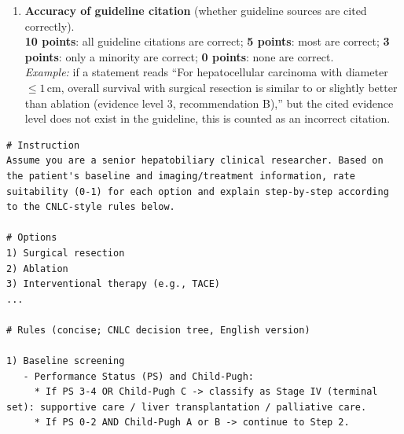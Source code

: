 \documentclass{article}
\begin{document}
\begin{appendices}
\begin{enumerate}
  \item \textbf{Accuracy of guideline citation} (whether guideline sources are cited correctly).\\
  \textbf{10 points}: all guideline citations are correct; \textbf{5 points}: most are correct; \textbf{3 points}: only a minority are correct; \textbf{0 points}: none are correct.\\
  \emph{Example:} if a statement reads “For hepatocellular carcinoma with diameter $\leq 1$\,cm, overall survival with surgical resection is similar to or slightly better than ablation (evidence level 3, recommendation B),” but the cited evidence level does not exist in the guideline, this is counted as an incorrect citation.
\end{enumerate}

\clearpage

\renewcommand{\figurename}{Figure}
\renewcommand{\tablename}{Table}
\renewcommand{\thefigure}{A\arabic{figure}} %
\renewcommand{\thetable}{A\arabic{table}}
\setcounter{table}{1}

\setcounter{figure}{0}
\newpage
\label{secA1}
\begin{lstlisting}[style=promptmono,floatplacement=h,caption={The summary of decision tree of CNLC},label={lst:hcc_prompt_cnlc}]
# Instruction
Assume you are a senior hepatobiliary clinical researcher. Based on the patient's baseline and imaging/treatment information, rate suitability (0-1) for each option and explain step-by-step according to the CNLC-style rules below.

# Options
1) Surgical resection
2) Ablation
3) Interventional therapy (e.g., TACE)
...

# Rules (concise; CNLC decision tree, English version)

1) Baseline screening
   - Performance Status (PS) and Child-Pugh:
     * If PS 3-4 OR Child-Pugh C -> classify as Stage IV (terminal set): supportive care / liver transplantation / palliative care.
     * If PS 0-2 AND Child-Pugh A or B -> continue to Step 2.


\end{lstlisting}
\end{appendices}
\end{document}
